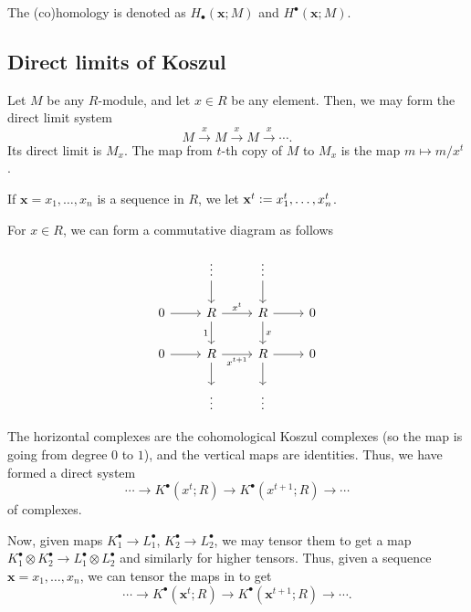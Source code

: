 \documentclass[12pt]{article}
\begin{document}
The (co)homology is denoted as $H_{\bullet}(\mathbf{x}; M)$ and $H^{\bullet}(\mathbf{x}; M)$.

\subsection{Direct limits of Koszul}

Let $M$ be any $R$-module, and let $x \in R$ be any element. Then, we may form the direct limit system
\begin{equation*} 
	M \xrightarrow{x} M \xrightarrow{x} M \xrightarrow{x} \cdots.
\end{equation*}
Its direct limit is $M_{x}$. The map from $t$-th copy of $M$ to $M_{x}$ is the map $m \mapsto m/x^{t}$.

If $\mathbf{x} = x_{1}, \ldots, x_{n}$ is a sequence in $R$, we let $\mathbf{x}^{t} \vcentcolon= x_{1}^{t}, \ldots, x_{n}^{t}$. 

For $x \in R$, we can form a commutative diagram as follows


\begin{equation*} 
	\begin{tikzcd}
            & \vdots \arrow[d]                    & \vdots \arrow[d]      &   \\
		0 \arrow[r] & R \arrow[r, "x^{t}"] \arrow[d, "1"'] & R \arrow[d, "x"] \arrow[r] & 0 \\
		0 \arrow[r] & R \arrow[r, "x^{t + 1}"'] \arrow[d] & R \arrow[d] \arrow[r] & 0 \\
		            & \vdots                              & \vdots                &  
	\end{tikzcd}
\end{equation*}

The horizontal complexes are the cohomological Koszul complexes (so the map is going from degree $0$ to $1$), and the vertical maps are identities. Thus, we have formed a direct system
\begin{equation} \label{eq:003}
	\cdots \to K^{\bullet}(x^{t}; R) \to K^{\bullet}(x^{t + 1}; R) \to \cdots
\end{equation}
of complexes.

Now, given maps $K_{1}^{\bullet} \to L_{1}^{\bullet}$, $K_{2}^{\bullet} \to L_{2}^{\bullet}$, we may tensor them to get a map $K_{1}^{\bullet} \otimes K_{2}^{\bullet} \to L_{1}^{\bullet} \otimes L_{2}^{\bullet}$ and similarly for higher tensors. Thus, given a sequence $\mathbf{x} = x_{1}, \ldots, x_{n}$, we can tensor the maps in  to get 
\begin{equation*}
	\cdots \to K^{\bullet}(\mathbf{x}^{t}; R) \to K^{\bullet}(\mathbf{x}^{t + 1}; R) \to \cdots.
\end{equation*}
\end{document}
